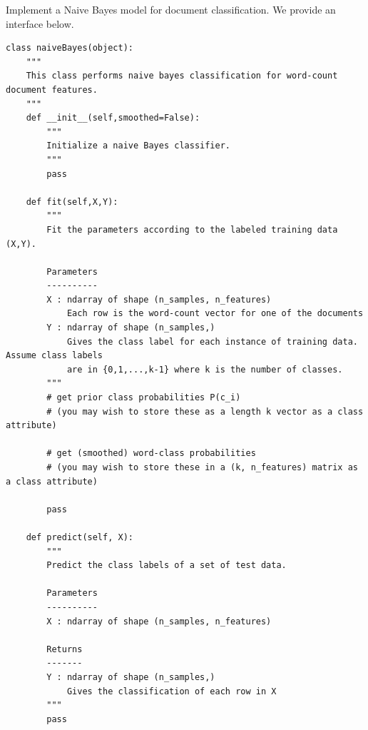 \begin{problem}
Implement a Naive Bayes model for document classification.
We provide an interface below.

\begin{lstlisting}
class naiveBayes(object):
    """
    This class performs naive bayes classification for word-count document features.
    """
    def __init__(self,smoothed=False):
        """
        Initialize a naive Bayes classifier.
        """
        pass

    def fit(self,X,Y):
        """
        Fit the parameters according to the labeled training data (X,Y).

        Parameters
        ----------
        X : ndarray of shape (n_samples, n_features)
            Each row is the word-count vector for one of the documents
        Y : ndarray of shape (n_samples,)
            Gives the class label for each instance of training data. Assume class labels
            are in {0,1,...,k-1} where k is the number of classes.
        """       
        # get prior class probabilities P(c_i)
        # (you may wish to store these as a length k vector as a class attribute)

        # get (smoothed) word-class probabilities
        # (you may wish to store these in a (k, n_features) matrix as a class attribute)
        
        pass

    def predict(self, X):
        """
        Predict the class labels of a set of test data.

        Parameters
        ----------
        X : ndarray of shape (n_samples, n_features)

        Returns
        -------
        Y : ndarray of shape (n_samples,)
            Gives the classification of each row in X
        """
        pass
\end{lstlisting}
\end{problem}

